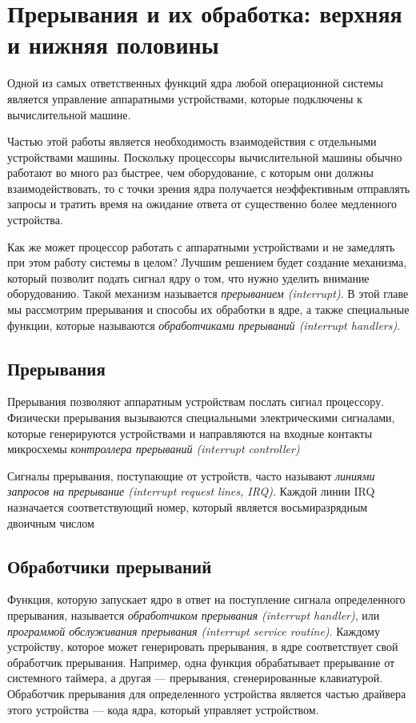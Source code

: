 \section{Прерывания и их обработка: верхняя и нижняя половины}

Одной из самых ответственных функций ядра любой операционной системы является управление аппаратными устройствами, которые подключены
к вычислительной машине. 

Частью этой работы является необходимость взаимодействия с отдельными устройствами машины. Поскольку процессоры вычислительной машины обычно работают во много раз быстрее, чем оборудование, с которым они должны взаимодействовать, то с точки зрения ядра получается неэффективным отправлять запросы и тратить время на ожидание ответа от существенно более медленного устройства. 

Как же может процессор работать с аппаратными устройствами и не замедлять при этом работу системы в целом? Лучшим решением будет создание механизма, который позволит подать сигнал ядру о том, что нужно уделить внимание оборудованию. Такой механизм называется \textit{прерыванием (interrupt)}. В этой главе мы рассмотрим прерывания и способы их обработки в ядре, а также специальные функции, которые называются \textit{обработчиками прерываний (interrupt handlers)}.

\subsection{Прерывания}
Прерывания позволяют аппаратным устройствам послать сигнал процессору. Физически прерывания вызываются специальными электрическими сигналами, которые генерируются устройствами и направляются на входные контакты микросхемы \textit{контроллера прерываний (interrupt controller)}

Сигналы прерывания, поступающие от устройств, часто называют \textit{линиями запросов на прерывание (interrupt request lines, IRQ)}. Каждой линии IRQ назначается соответствующий номер, который является восьмиразрядным двоичным числом

\subsection{Обработчики прерываний}

Функция, которую запускает ядро в ответ на поступление сигнала определенного прерывания, называется \textit{обработчиком прерывания (interrupt handler)}, или \textit{программой обслуживания прерывания (interrupt service routine)}. Каждому устройству, которое может генерировать прерывания, в ядре соответствует свой обработчик прерывания. Например, одна функция обрабатывает прерывание от системного таймера, а другая — прерывания, сгенерированные клавиатурой. Обработчик прерывания для определенного устройства является частью драйвера этого устройства — кода ядра, который управляет устройством.

